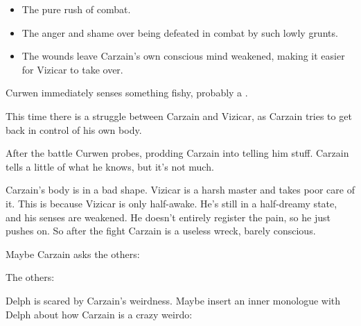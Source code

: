 \begin{itemize}
  \item The pure rush of combat. 
  \item The anger and shame over being defeated in combat by such lowly grunts. 
  \item The wounds leave Carzain's own conscious mind weakened, making it easier for Vizicar to take over. 
\end{itemize}




Curwen immediately senses something fishy, probably a \vertexspike{}. 

This time there is a struggle between Carzain and Vizicar, as Carzain tries to get back in control of his own body. 


After the battle Curwen probes, prodding Carzain into telling him stuff. Carzain tells a little of what he knows, but it's not much. 

Carzain's body is in a bad shape. 
Vizicar is a harsh master and takes poor care of it. 
This is because Vizicar is only half-awake. 
He's still in a half-dreamy state, and his senses are weakened. 
He doesn't entirely register the pain, so he just pushes on. 
So after the fight Carzain is a useless wreck, barely conscious. 

Maybe Carzain asks the others:  

The others: 

Delph is scared by Carzain's weirdness. Maybe insert an inner monologue with Delph about how Carzain is a crazy weirdo: 

